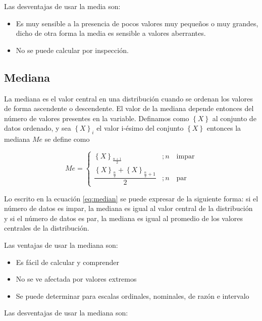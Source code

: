 \documentclass[]{book}
\providecommand{\tightlist}{%
  \setlength{\itemsep}{0pt}\setlength{\parskip}{0pt}}
\begin{document}
Las desventajas de usar la media son:

\begin{itemize}
\tightlist
\item
  Es muy sensible a la presencia de pocos valores muy pequeños o muy
  grandes, dicho de otra forma la media es sensible a valores
  aberrantes.
\item
  No se puede calcular por inspección.
\end{itemize}

\subsection{Mediana}\label{mediana}

La mediana es el valor central en una distribución cuando se ordenan los
valores de forma ascendente o descendente. El valor de la mediana
depende entonces del número de valores presentes en la variable.
Definamos como \(\left\{ X \right \}\) al conjunto de datos ordenado, y
sea \(\left \{ X \right \}_i\) el valor i-ésimo del conjunto
\(\left \{ X \right \}\) entonces la mediana \(Me\) se define como

\begin{equation}
Me = \begin{cases} 
      \left \{ X \right\}_{\frac{n+1}{2}} & ; n \quad \textrm{impar}  \\
      \dfrac{\left \{ X  \right \}_{\frac{n}{2}} + \left \{ X  \right \}_{\frac{n}{2}+1} }{2} & ; n \quad \textrm{par}
   \end{cases}
   \label{eq:median}
\end{equation}

Lo escrito en la ecuación \eqref{eq:median} se puede expresar de la
siguiente forma: si el número de datos es impar, la mediana es igual al
valor central de la distribución y si el número de datos es par, la
mediana es igual al promedio de los valores centrales de la
distribución.

Las ventajas de usar la mediana son:

\begin{itemize}
\tightlist
\item
  Es fácil de calcular y comprender
\item
  No se ve afectada por valores extremos
\item
  Se puede determinar para escalas ordinales, nominales, de razón e
  intervalo
\end{itemize}

Las desventajas de usar la mediana son:
\end{document}
